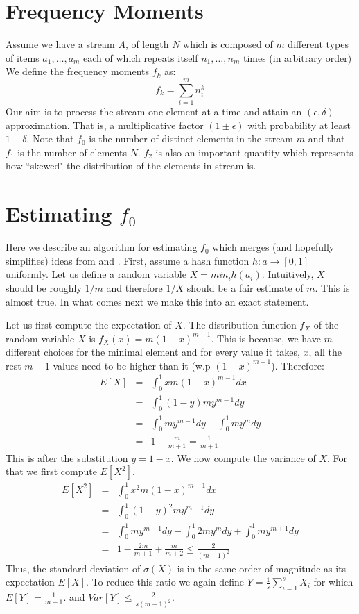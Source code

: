 \documentclass{article}
\begin{document}
 
\section*{Frequency Moments}
Assume we have a stream $A$, of length $N$ which is composed of $m$ 
different types of items $a_1,\ldots,a_m$ each of which repeats itself $n_1,\ldots,n_m$ times (in arbitrary order)
We define the frequency moments $f_k$ as:
\[
f_k = \sum_{i=1}^{m} n_{i}^{k}
\]
%
Our aim is to process the stream one element at a time and attain an $(\epsilon,\delta)$-approximation.
That is, a multiplicative factor $(1\pm\epsilon)$ with probability at least $1-\delta$.  
Note that $f_0$ is the number of distinct elements in the stream $m$ and that $f_1$ is the number of elements $N$.
$f_2$ is also an important quantity which represents how ``skewed" the distribution of the elements in stream is.

\section*{Estimating $f_0$}
Here we describe an algorithm for estimating $f_0$ 
which merges (and hopefully simplifies) ideas from \cite{AMS96} and \cite{Cohen97}.
First, assume a hash function $h: a \rightarrow [0,1]$ uniformly.
Let us define a random variable $X = min_{i}h(a_i)$.
Intuitively, $X$ should be roughly $1/m$ and therefore $1/X$ should be a fair estimate of $m$.
This is almost true. In what comes next we make this into an exact statement.

Let us first compute the expectation of $X$. The distribution function $f_X$ of the random variable $X$
is $f_X(x) = m(1-x)^{m-1}$. This is because, we have $m$ different choices for the minimal 
element and for every value it takes, $x$, all the rest $m-1$ values
need to be higher than it (w.p $(1-x)^{m-1}$). Therefore:
\begin{eqnarray*}
E[X] &=& \int_{0}^{1} x m (1-x)^{m-1}dx \\
&=& \int_{0}^{1} (1- y) m y^{m-1}dy \\
&=& \int_{0}^{1} m y^{m-1}dy - \int_{0}^{1} m y^{m}dy\\
&=& 1- \frac{m}{m+1} = \frac{1}{m+1}
\end{eqnarray*}
This is after the substitution $y = 1-x$. We now compute the variance of $X$.
For that we first compute $E[X^2]$.
\begin{eqnarray*}
E[X^2] &=& \int_{0}^{1} x^2 m (1-x)^{m-1}dx \\
&=& \int_{0}^{1} (1- y)^2 m y^{m-1}dy \\
&=& \int_{0}^{1} m y^{m-1}dy - \int_{0}^{1} 2 m y^{m}dy + \int_{0}^{1}  m y^{m+1}dy\\
&=& 1- \frac{2m}{m+1} + \frac{m}{m+2} \le \frac{2}{(m+1)^2}
\end{eqnarray*}
Thus, the standard deviation of $\sigma(X)$ is in the same order of magnitude as its expectation $E[X]$.
To reduce this ratio we again define $Y = \frac{1}{s}\sum_{i=1}^{s}X_i$ for which $E[Y] = \frac{1}{m+1}$.
and $Var[Y] \le \frac{2}{s(m+1)^2}$.
\end{document}
